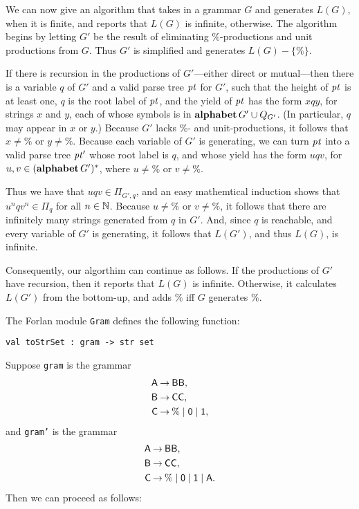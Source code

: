 We can now give an algorithm that takes in a grammar $G$ and generates
$L(G)$, when it is finite, and reports that $L(G)$ is infinite,
otherwise. The algorithm begins by letting $G'$ be the result of
eliminating $\%$-productions and unit productions from $G$. Thus $G'$
is simplified and generates $L(G)-\{\%\}$.

If there is recursion in the productions of $G'$---either direct or
mutual---then there is a variable $q$ of $G'$ and a valid parse tree
${\it pt}$ for $G'$, such that the height of ${\it pt}$ is at least one, $q$ is
the root label of ${\it pt}$, and the yield of ${\it pt}$ has the form $xqy$,
for strings $x$ and $y$, each of whose symbols is in
$\mathbf{alphabet}\,G'\cup Q_{G'}$. (In particular, $q$ may appear in $x$ or
$y$.) Because $G'$ lacks $\%$- and unit-productions, it follows that
$x\neq\%$ or $y\neq\%$. Because each variable of $G'$ is generating,
we can turn ${\it pt}$ into a valid parse tree ${\it pt}'$ whose root label is
$q$, and whose yield has the form $uqv$, for
$u,v\in(\mathbf{alphabet}\,G')^*$, where $u\neq\%$ or $v\neq\%$.

Thus we have that $uqv\in\Pi_{G',q}$, and an easy mathemtical
induction shows that $u^nqv^n\in\Pi_q$ for all $n\in\mathbb{N}$.  Because
$u\neq\%$ or $v\neq\%$, it follows that there are infinitely many
strings generated from $q$ in $G'$. And, since $q$ is reachable, and
every variable of $G'$ is generating, it follows that $L(G')$, and
thus $L(G)$, is infinite.

Consequently, our algorthim can continue as follows. If the
productions of $G'$ have recursion, then it reports that $L(G)$ is
infinite.  Otherwise, it calculates $L(G')$ from the bottom-up, and
adds $\%$ iff $G$ generates $\%$.

The Forlan module \texttt{Gram} defines the following function:
\begin{verbatim}
val toStrSet : gram -> str set
\end{verbatim}
Suppose \texttt{gram} is the grammar
\begin{align*}
\mathsf{A} &\mathbin{\to} \mathsf{BB}, \\
\mathsf{B} &\mathbin{\to} \mathsf{CC}, \\
\mathsf{C} &\mathbin{\to} \% \mid \mathsf{0} \mid \mathsf{1} ,
\end{align*}
and
\texttt{gram'} is the grammar
\begin{align*}
\mathsf{A} &\mathbin{\to} \mathsf{BB}, \\
\mathsf{B} &\mathbin{\to} \mathsf{CC}, \\
\mathsf{C} &\mathbin{\to} \% \mid \mathsf{0} \mid \mathsf{1} \mid \mathsf{A} .
\end{align*}
Then we can proceed as follows:
  

